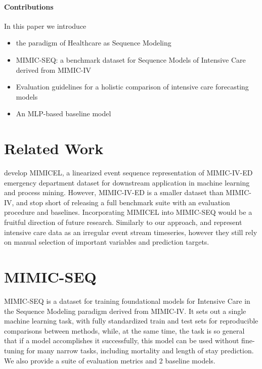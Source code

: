 \paragraph{Contributions}

In this paper we introduce
\begin{itemize}
    \item the paradigm of Healthcare as Sequence Modeling
    \item MIMIC-SEQ: a benchmark dataset for Sequence Models of Intensive Care derived from MIMIC-IV
    \item Evaluation guidelines for a holistic comparison of intensive care forecasting models
    \item An MLP-based baseline model
\end{itemize}

\newpage
\section{Related Work}

\cite{weiMIMICELMIMICIVEvent2022} develop MIMICEL, a linearized event sequence representation of MIMIC-IV-ED \cite{johnsonMIMICIVED2021} emergency department dataset for downstream application in machine learning and process mining. 
However, MIMIC-IV-ED is a smaller dataset than MIMIC-IV, and \cite{weiMIMICELMIMICIVEvent2022} stop short of releasing a full benchmark suite with an evaluation procedure and baselines.
Incorporating MIMICEL into MIMIC-SEQ would be a fruitful direction of future research.
Similarly to our approach,
\cite{kuznetsovaImportanceStepwiseEmbeddings2023} and \cite{tipirneniSelfSupervisedTransformerSparse2022} represent intensive care data as an irregular event stream timeseries, however they still rely on manual selection of important variables and prediction targets.

\section{MIMIC-SEQ}
\label{sec:dataset}

MIMIC-SEQ is a dataset for training foundational models for Intensive Care in the Sequence Modeling paradigm derived from MIMIC-IV.
It sets out a single machine learning task, with fully standardized train and test sets for reproducible comparisons between methods, while, at the same time, the task is so general that if a model accomplishes it successfully, this model can be used without fine-tuning for many narrow tasks, including mortality and length of stay prediction.
We also provide a suite of evaluation metrics and 2 baseline models.

